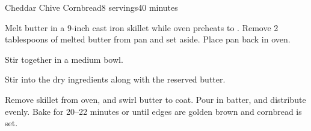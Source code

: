 \documentclass[../Cookbook.tex]{subfiles}
\begin{document}
\begin{recipe}{Cheddar Chive Cornbread}{8 servings}{40 minutes}

Melt butter in a 9-inch cast iron skillet while oven preheats to . Remove 2 tablespoons of melted butter from pan and set aside. Place pan back in oven.

Stir together in a medium bowl.

Stir into the dry ingredients along with the reserved butter.

Remove skillet from oven, and swirl butter to coat. Pour in batter, and distribute evenly. Bake for 20--22 minutes or until edges are golden brown and cornbread is set.

\end{recipe}
\end{document}
